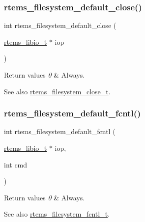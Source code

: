 \subsubsection{\texorpdfstring{rtems\_filesystem\_default\_close()}{rtems\_filesystem\_default\_close()}}
{\footnotesize\ttfamily int rtems\+\_\+filesystem\+\_\+default\+\_\+close (\begin{DoxyParamCaption}\item[{\mbox{\hyperlink{structrtems__libio__tt}{rtems\+\_\+libio\+\_\+t}} $\ast$}]{iop }\end{DoxyParamCaption})}


\begin{DoxyRetVals}{Return values}
{\em 0} & Always.\\
\hline
\end{DoxyRetVals}
\begin{DoxySeeAlso}{See also}
\mbox{\hyperlink{group__LibIOFSHandler_ga9c520e776b733893afba2997e163c8af}{rtems\+\_\+filesystem\+\_\+close\+\_\+t}}. 
\end{DoxySeeAlso}
\mbox{\label{group__LibIOFSHandler_ga090f67473d9fa5f26368adeb11c939c8}} 
\subsubsection{\texorpdfstring{rtems\_filesystem\_default\_fcntl()}{rtems\_filesystem\_default\_fcntl()}}
{\footnotesize\ttfamily int rtems\+\_\+filesystem\+\_\+default\+\_\+fcntl (\begin{DoxyParamCaption}\item[{\mbox{\hyperlink{structrtems__libio__tt}{rtems\+\_\+libio\+\_\+t}} $\ast$}]{iop,  }\item[{int}]{cmd }\end{DoxyParamCaption})}


\begin{DoxyRetVals}{Return values}
{\em 0} & Always.\\
\hline
\end{DoxyRetVals}
\begin{DoxySeeAlso}{See also}
\mbox{\hyperlink{group__LibIOFSHandler_ga4af1bd820051eb2fc74b91f5d8868e06}{rtems\+\_\+filesystem\+\_\+fcntl\+\_\+t}}. 
\end{DoxySeeAlso}
\mbox{\label{group__LibIOFSHandler_ga8df6ed93bdd72abc2cda577c8f78fd54}} 
